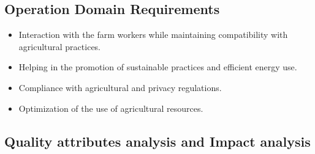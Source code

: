 \subsection{Operation Domain Requirements}

\begin{itemize}
    \item Interaction with the farm workers while maintaining compatibility with agricultural practices.
    \item Helping in the promotion of sustainable practices and efficient energy use.
    \item Compliance with agricultural and privacy regulations.
    \item Optimization of the use of agricultural resources.
\end{itemize}

\clearpage
\subsection{Quality attributes analysis and Impact analysis}

